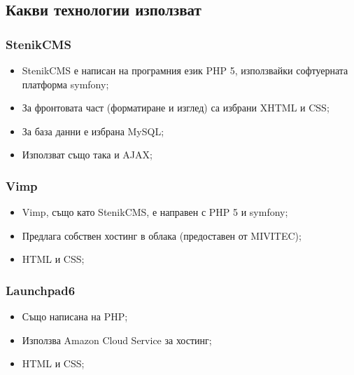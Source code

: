 \documentclass[pdftex,12pt,a4paper]{report}
\begin{document}
\subsection[Какви технологии използват] {Какви технологии използват}
\subsubsection[StenikCMS] {StenikCMS}
\begin{itemize}
	\item StenikCMS е написан на програмния език PHP 5, използвайки софтуерната платформа symfony;
	\item За фронтовата част (форматиране и изглед) са избрани XHTML и CSS;
	\item За база данни е избрана MySQL;
	\item Използват също така и AJAX;
\end{itemize}
\subsubsection[Vimp] {Vimp}
\begin{itemize}
	\item Vimp, също като StenikCMS, е направен с PHP 5 и symfony;
	\item Предлага собствен хостинг в облака (предоставен от MIVITEC);
	\item HTML и CSS;
\end{itemize}
\subsubsection[Launchpad6] {Launchpad6}
\begin{itemize}
	\item Също написана на PHP;
	\item Използва Amazon Cloud Service за хостинг;
	\item HTML и CSS;
\end{itemize}
\end{document}
